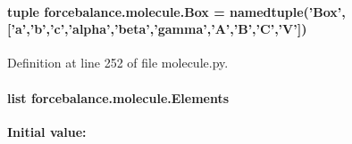 \hypertarget{namespaceforcebalance_1_1molecule_aa761cf1cf260e15d0b03a6f61569c840}{
\paragraph[{Box}]{\setlength{\rightskip}{0pt plus 5cm}tuple forcebalance.\-molecule.\-Box = namedtuple('Box',\mbox{[}'a','b','c','alpha','beta','gamma','A','B','C','V'\mbox{]})}}\label{namespaceforcebalance_1_1molecule_aa761cf1cf260e15d0b03a6f61569c840}


Definition at line 252 of file molecule.\-py.

\hypertarget{namespaceforcebalance_1_1molecule_a1c99a11e8a749468698c9af6361a8a4c}{
\paragraph[{Elements}]{\setlength{\rightskip}{0pt plus 5cm}list forcebalance.\-molecule.\-Elements}}\label{namespaceforcebalance_1_1molecule_a1c99a11e8a749468698c9af6361a8a4c}
{\bfseries Initial value\-:}
